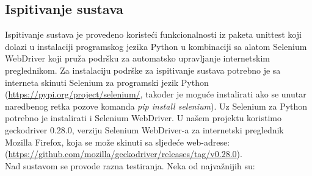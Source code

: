 		\subsection{Ispitivanje sustava}
			
			Ispitivanje sustava je provedeno koristeći funkcionalnosti iz paketa unittest koji dolazi u instalaciji programskog jezika Python u kombinaciji sa alatom Selenium WebDriver koji pruža podršku za automatsko upravljanje internetskim preglednikom. Za instalaciju podrške za ispitivanje sustava potrebno je sa interneta skinuti Selenium za programski jezik Python (\url{https://pypi.org/project/selenium/}, također je moguće instalirati ako se unutar naredbenog retka pozove komanda \textit{pip install selenium}). Uz Selenium za Python potrebno je instalirati i Selenium WebDriver. U našem projektu koristimo geckodriver 0.28.0, verziju Selenium WebDriver-a za internetski preglednik Mozilla Firefox, koja se može skinuti sa sljedeće web-adrese: (\url{https://github.com/mozilla/geckodriver/releases/tag/v0.28.0}).\\
			Nad sustavom se provode razna testiranja. Neka od najvažnijih su:
			
